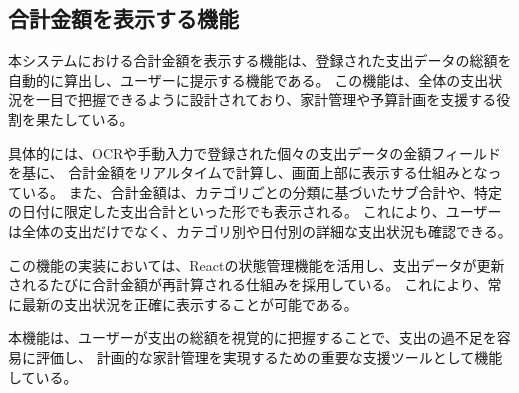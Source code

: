\documentclass[main]{subfiles}
\begin{document}
\subsection{合計金額を表示する機能}

本システムにおける合計金額を表示する機能は、登録された支出データの総額を自動的に算出し、ユーザーに提示する機能である。
この機能は、全体の支出状況を一目で把握できるように設計されており、家計管理や予算計画を支援する役割を果たしている。

具体的には、OCRや手動入力で登録された個々の支出データの金額フィールドを基に、
合計金額をリアルタイムで計算し、画面上部に表示する仕組みとなっている。
また、合計金額は、カテゴリごとの分類に基づいたサブ合計や、特定の日付に限定した支出合計といった形でも表示される。
これにより、ユーザーは全体の支出だけでなく、カテゴリ別や日付別の詳細な支出状況も確認できる。

この機能の実装においては、Reactの状態管理機能を活用し、支出データが更新されるたびに合計金額が再計算される仕組みを採用している。
これにより、常に最新の支出状況を正確に表示することが可能である。

本機能は、ユーザーが支出の総額を視覚的に把握することで、支出の過不足を容易に評価し、
計画的な家計管理を実現するための重要な支援ツールとして機能している。
\end{document}
